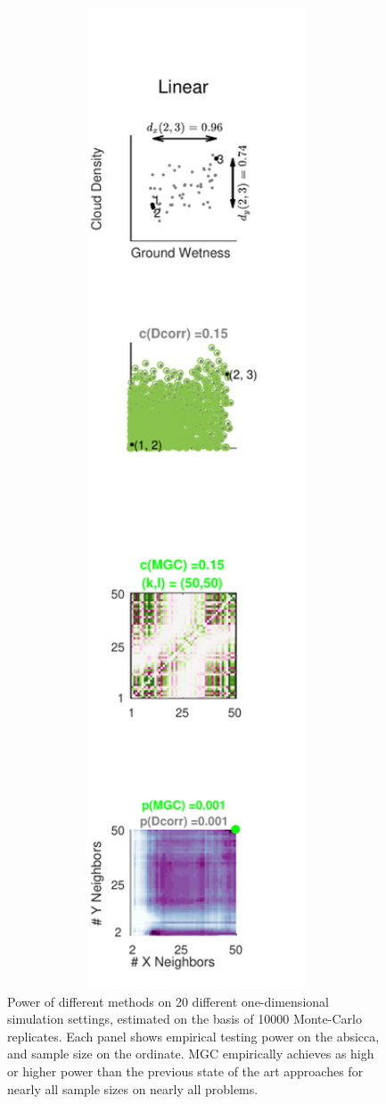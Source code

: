 \documentclass[11pt]{article}
\begin{document}
\begin{figure}[htbp]
\includegraphics[width=1.0\textwidth]{../Figures/Fig1}
\caption{
Power of different methods on 20 different one-dimensional simulation settings, estimated on the basis of 10000 Monte-Carlo replicates.
Each panel shows empirical testing power on the absicca, and sample size on the ordinate.
MGC empirically achieves as high or higher power than the previous state of the art approaches for nearly all sample sizes on nearly all problems.}
\label{fig:1D}
\end{figure}
\end{document}
